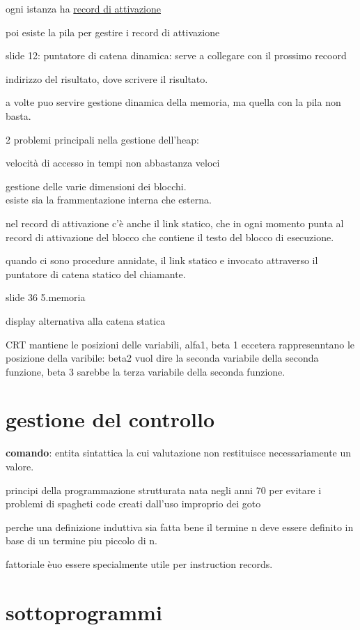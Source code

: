 \documentclass[12pt]{article}
\begin{document}
ogni istanza ha \underline{record di attivazione}

poi esiste la pila per gestire i record di attivazione

slide 12: puntatore di catena dinamica: serve a collegare con il prossimo recoord

indirizzo del risultato, dove scrivere il risultato.

a volte puo servire gestione dinamica della memoria, ma quella con la pila non basta.

2 problemi principali nella gestione dell'heap:

velocità di accesso in tempi non abbastanza veloci

gestione delle varie dimensioni dei blocchi.\\

esiste sia la frammentazione interna che esterna.


nel record di attivazione c'è anche il link statico, che in ogni momento punta al record di attivazione del blocco che contiene il testo del blocco di esecuzione.

quando ci sono procedure annidate, il link statico e invocato attraverso il puntatore di catena statico del chiamante.

slide 36 5.memoria 

display alternativa alla catena statica

CRT mantiene le posizioni delle variabili, alfa1, beta 1 eccetera rappresenntano le posizione della varibile: beta2 vuol dire la seconda variabile della seconda funzione, beta 3 sarebbe la terza variabile della seconda funzione.

\section{gestione del controllo}

\textbf{comando}: entita sintattica la cui valutazione non restituisce necessariamente un valore.


principi della programmazione strutturata nata negli anni 70 per evitare i problemi di spagheti code creati dall'uso improprio dei goto

perche una definizione induttiva sia fatta bene il termine n deve essere definito in base di un termine piu piccolo di n.


fattoriale èuo essere specialmente utile per instruction records.

\section{sottoprogrammi}
\end{document}
